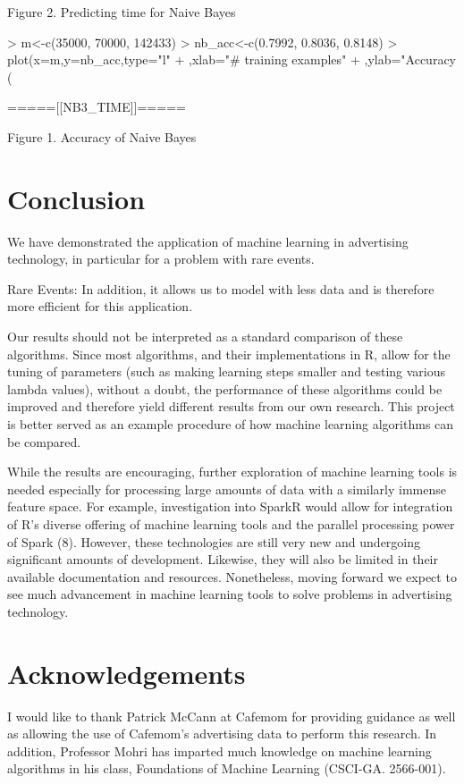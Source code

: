 \documentclass[a4paper]{article}
\begin{document}
\begin{multicols}{2}
\begin{center}
Figure 2. Predicting time for Naive Bayes
\end{center}

\begin{Schunk}
\begin{Sinput}
> m<-c(35000, 70000, 142433)
> nb_acc<-c(0.7992, 0.8036, 0.8148)
> plot(x=m,y=nb_acc,type="l"
+      ,xlab="# training examples"
+      ,ylab="Accuracy (%)")
\end{Sinput}
\end{Schunk}
\begin{center}
=====[[NB3\_TIME]]=====

Figure 1. Accuracy of Naive Bayes
\end{center}


\section*{Conclusion}
We have demonstrated the application of machine learning in advertising technology, in particular for a problem with rare events. 


Rare Events: In addition, it allows us to model with less data and is therefore more efficient for this application.


Our results should not be interpreted as a standard comparison of these algorithms. Since most algorithms, and their implementations in R, allow for the tuning of parameters (such as making learning steps smaller and testing various lambda values), without a doubt, the performance of these algorithms could be improved and therefore yield different results from our own research. This project is better served as an example procedure of how machine learning algorithms can be compared.

While the results are encouraging, further exploration of machine learning tools is needed especially for processing large amounts of data with a similarly immense feature space. For example, investigation into SparkR would allow for integration of R's diverse offering of machine learning tools and the parallel processing power of Spark (8). However, these technologies are still very new and undergoing significant amounts of development. Likewise, they will also be limited in their available documentation and resources. Nonetheless, moving forward we expect to see much advancement in machine learning tools to solve problems in advertising technology.

\section*{Acknowledgements}
I would like to thank Patrick McCann at Cafemom for providing guidance as well as allowing the use of Cafemom's advertising data to perform this research. In addition, Professor Mohri has imparted much knowledge on machine learning algorithms in his class, Foundations of Machine Learning (CSCI-GA. 2566-001).

\end{multicols}
\end{document}
